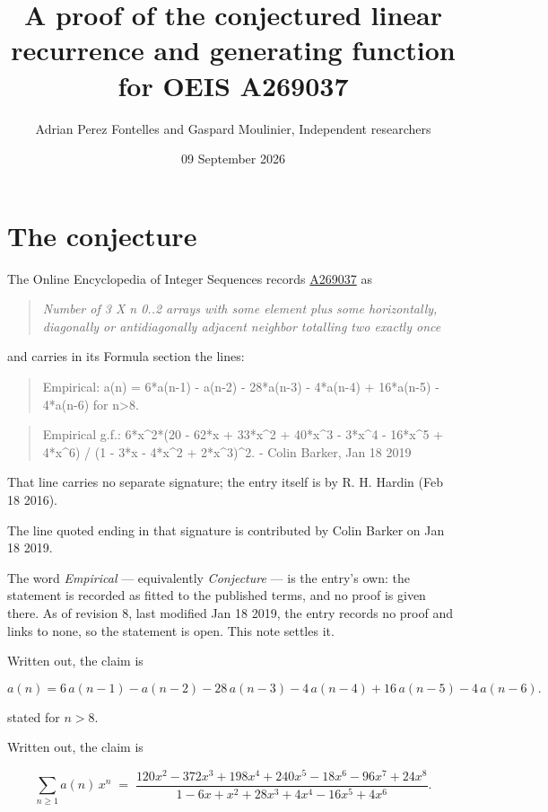 \documentclass[11pt]{article}
\title{A proof of the conjectured linear recurrence and generating function for OEIS A269037}
\author{Adrian Perez Fontelles and Gaspard Moulinier, Independent researchers}
\date{09 September 2026}
\theoremstyle{definition}
\begin{document}
\maketitle
\section{The conjecture}

The Online Encyclopedia of Integer Sequences records \href{https://oeis.org/A269037}{A269037} as

\begin{quote}\itshape Number of 3 X n 0..2 arrays with some element plus some horizontally, diagonally or antidiagonally adjacent neighbor totalling two exactly once\end{quote}

and carries in its Formula section the lines:

\begin{quote}\ttfamily Empirical: a(n) = 6*a(n-1) - a(n-2) - 28*a(n-3) - 4*a(n-4) + 16*a(n-5) - 4*a(n-6) for n>8.\end{quote}

\begin{quote}\ttfamily Empirical g.f.: 6*x\textasciicircum{}2*(20 - 62*x + 33*x\textasciicircum{}2 + 40*x\textasciicircum{}3 - 3*x\textasciicircum{}4 - 16*x\textasciicircum{}5 + 4*x\textasciicircum{}6) / (1 - 3*x - 4*x\textasciicircum{}2 + 2*x\textasciicircum{}3)\textasciicircum{}2. - Colin Barker, Jan 18 2019\end{quote}

That line carries no separate signature; the entry itself is by R. H. Hardin (Feb 18 2016).

The line quoted ending in that signature is contributed by Colin Barker on Jan 18 2019.

The word {\itshape Empirical} --- equivalently {\itshape Conjecture} --- is the entry's own: the statement is recorded as fitted to the published terms, and no proof is given there. As of revision 8, last modified Jan 18 2019, the entry records no proof and links to none, so the statement is open. This note settles it.

Written out, the claim is

\[a(n) = 6\,a(n-1) - a(n-2) - 28\,a(n-3) - 4\,a(n-4) + 16\,a(n-5) - 4\,a(n-6).\]

stated for $n > 8$.

Written out, the claim is

\[\sum_{n \ge 1} a(n)\,x^n \;=\; \frac{120x^{2} - 372x^{3} + 198x^{4} + 240x^{5} - 18x^{6} - 96x^{7} + 24x^{8}}{1 - 6x + x^{2} + 28x^{3} + 4x^{4} - 16x^{5} + 4x^{6}}.\]
\end{document}
